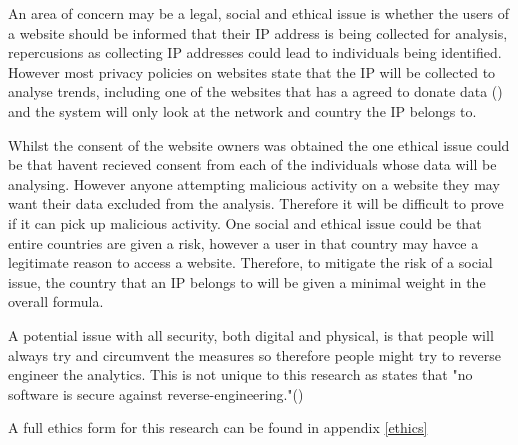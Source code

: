 
An area of concern may be a legal, social and ethical issue is whether the users of a website should be informed that their IP address is being collected for analysis, repercusions as collecting IP addresses could lead to individuals being identified. However most privacy policies on websites state that the IP will be collected to analyse trends, including one of the websites that has a agreed to donate data (\cite{PetersWebPrivacy}) and the system will only look at the network and country the IP belongs to.


Whilst the  consent of the website owners was  obtained the one ethical issue could be that  havent recieved consent from each of the individuals whose data will be analysing. However anyone attempting malicious activity on a website they may want their data excluded from the analysis. Therefore it will be difficult to prove if it can pick up malicious activity. One social and ethical issue could be that entire countries are given a risk, however a user in that country may havce a legitimate reason to access a website. Therefore, to mitigate the risk of a social issue, the country that an IP belongs to will be given a minimal weight in the overall formula. 

A potential issue with all security, both digital and physical, is that people will always try and circumvent the measures so therefore people might try to reverse engineer the analytics. This is not unique to this research as \citeauthor{708447} states that "no software is secure against reverse-engineering."(\cite{708447})

A full ethics form for this research can be found in appendix \ref{ethics}

